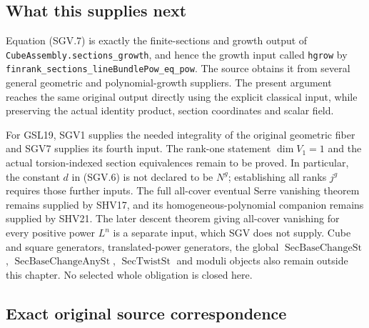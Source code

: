 \documentclass[11pt,a4paper]{article}
\numberwithin{equation}{section}
\theoremstyle{remark}\newtheorem{remark}[theorem]{Remark}
\begin{document}
\subsection*{What this supplies next}

Equation (SGV.7) is exactly the finite-sections and growth output of
\nolinkurl{CubeAssembly.sections_growth}, and hence the growth input
called \texttt{hgrow} by
\nolinkurl{finrank_sections_lineBundlePow_eq_pow}.  The source obtains
it from several general geometric and polynomial-growth suppliers.
The present argument reaches the same original output directly using
the explicit classical input, while preserving the actual identity
product, section coordinates and scalar field.

For GSL19, SGV1 supplies the needed integrality of the original
geometric fiber and SGV7 supplies its fourth input.  The rank-one
statement $\dim V_1=1$ and the actual torsion-indexed section
equivalences remain to be proved.  In particular, the constant $d$ in
(SGV.6) is not declared to be $N^g$; establishing all ranks $j^g$
requires those further inputs.  The full all-cover eventual Serre
vanishing theorem remains supplied by SHV17, and its homogeneous-polynomial
companion remains supplied by SHV21.  The later descent theorem giving
all-cover vanishing for every positive power $L^n$ is a separate input,
which SGV does not supply.  Cube and square generators, translated-power
generators, the global $\operatorname{SecBaseChangeSt}$,
$\operatorname{SecBaseChangeAnySt}$, $\operatorname{SecTwistSt}$ and
moduli objects also remain outside this chapter.  No selected whole
obligation is closed here.

\subsection*{Exact original source correspondence}
\end{document}
